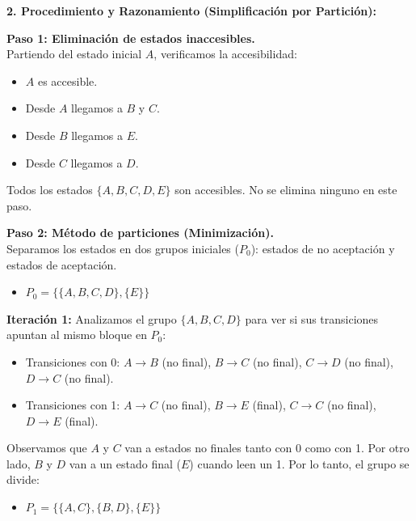 \documentclass[12pt]{article}
\begin{document}
\vspace{0.5cm}

\textbf{2. Procedimiento y Razonamiento (Simplificación por Partición):}

\textbf{Paso 1: Eliminación de estados inaccesibles.} \\
Partiendo del estado inicial $A$, verificamos la accesibilidad:
\begin{itemize}
    \item $A$ es accesible.
    \item Desde $A$ llegamos a $B$ y $C$.
    \item Desde $B$ llegamos a $E$.
    \item Desde $C$ llegamos a $D$.
\end{itemize}
Todos los estados $\{A, B, C, D, E\}$ son accesibles. No se elimina ninguno en este paso.

\vspace{0.3cm}

\textbf{Paso 2: Método de particiones (Minimización).} \\
Separamos los estados en dos grupos iniciales ($P_0$): estados de no aceptación y estados de aceptación.
\begin{itemize}
    \item $P_0 = \{ \{A, B, C, D\}, \{E\} \}$
\end{itemize}

\textbf{Iteración 1:} Analizamos el grupo $\{A, B, C, D\}$ para ver si sus transiciones apuntan al mismo bloque en $P_0$:
\begin{itemize}
    \item Transiciones con 0: $A \rightarrow B$ (no final), $B \rightarrow C$ (no final), $C \rightarrow D$ (no final), $D \rightarrow C$ (no final).
    \item Transiciones con 1: $A \rightarrow C$ (no final), $B \rightarrow E$ (final), $C \rightarrow C$ (no final), $D \rightarrow E$ (final).
\end{itemize}
Observamos que $A$ y $C$ van a estados no finales tanto con 0 como con 1. Por otro lado, $B$ y $D$ van a un estado final ($E$) cuando leen un 1. Por lo tanto, el grupo se divide:
\begin{itemize}
    \item $P_1 = \{ \{A, C\}, \{B, D\}, \{E\} \}$
\end{itemize}
\end{document}
